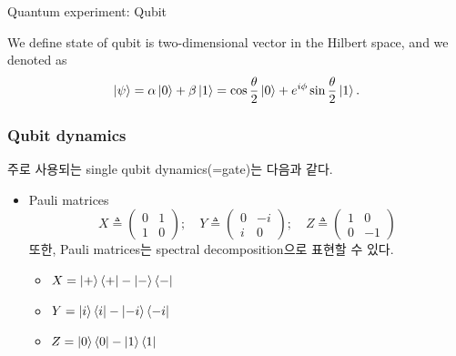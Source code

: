 \documentclass[9pt]{beamer}
\begin{document}
\begin{section}{Quantum experiment: Qubit}
\begin{frame}
\begin{itemize}
                \end{itemize}
                \begin{definition}
                    We define state of qubit is two-dimensional vector in the Hilbert space, and we denoted as
                    $$ \begin{aligned} \ket{\psi}  = \alpha \ket{0} + \beta \ket{1} 
                    = \cos  \frac{\theta}{2}  \ket 0+ e^{i \phi} \sin  \frac{\theta}{2}  \ket 1. \end{aligned}$$ 
                    
                \end{definition}
        \end{frame}

        \begin{frame}
            \frametitle{Qubit dynamics}
                주로 사용되는 single qubit dynamics(=gate)는 다음과 같다.
                \begin{itemize}
                    \item Pauli matrices 
                    $$
                    X \triangleq \left(\begin{array}{cc}
                    0 & 1 \\
                    1 & 0
                    \end{array}\right) ; \quad Y \triangleq\left(\begin{array}{cc}
                    0 & -i \\
                    i & 0
                    \end{array}\right); \quad Z \triangleq\left(\begin{array}{cc}
                    1 & 0 \\
                    0 & -1
                    \end{array}\right)
                    $$
                    또한, Pauli matrices는 spectral decomposition으로 표현할 수 있다.
                    \begin{itemize}
                        \item $X = \ket + \bra + - \ket - \bra -$
                        \item $Y = \ket i \bra i - \ket{-i} \bra {-i}$
                        \item $Z = \ket 0 \bra 0 - \ket 1 \bra 1$
                    \end{itemize}
                    \vspace{0.1cm}

\end{itemize}
\end{frame}
\end{section}
\end{document}
